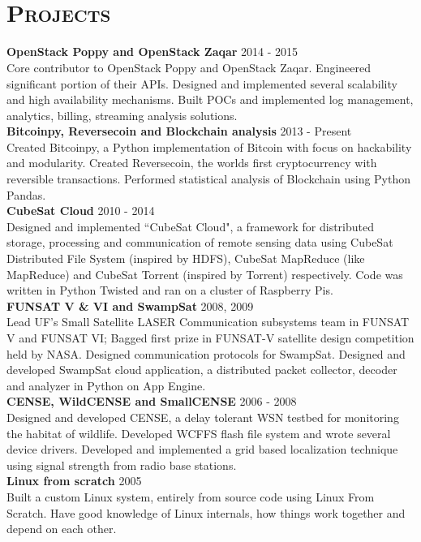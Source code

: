 \begin{resume}
\begin{formatb}
  \\
  \body\\
\end{formatb}

\section{\textsc{Projects}}
\textbf{OpenStack Poppy and OpenStack Zaqar} \hfill 2014 - 2015\\
Core contributor to OpenStack Poppy and OpenStack Zaqar. Engineered significant portion of their APIs. Designed and implemented several scalability and high availability mechanisms. Built POCs and implemented log management, analytics, billing, streaming analysis solutions.\\
\textbf{Bitcoinpy, Reversecoin and Blockchain analysis} \hfill 2013 - Present\\
Created Bitcoinpy, a Python implementation of Bitcoin with focus on hackability and modularity. Created Reversecoin, the worlds first cryptocurrency with reversible transactions. Performed statistical analysis of Blockchain using Python Pandas.\\
\textbf{CubeSat Cloud} \hfill 2010 - 2014 \\
Designed and implemented ``CubeSat Cloud", a framework for distributed storage, processing and communication of remote sensing data using CubeSat Distributed File System (inspired by HDFS), CubeSat MapReduce (like MapReduce) and CubeSat Torrent (inspired by Torrent) respectively. Code was written in Python Twisted and ran on a cluster of Raspberry Pis.\\
\textbf{FUNSAT V \& VI and SwampSat} \hfill 2008, 2009 \\
Lead UF's Small Satellite LASER Communication subsystems team in FUNSAT V and FUNSAT VI; Bagged first prize in FUNSAT-V satellite design competition held by NASA. Designed communication protocols for SwampSat. Designed and developed SwampSat cloud application, a distributed packet collector, decoder and analyzer in Python on App Engine.\\
\textbf{CENSE, WildCENSE and SmallCENSE} \hfill 2006 - 2008\\
Designed and developed CENSE, a delay tolerant WSN testbed for monitoring the habitat of wildlife. Developed WCFFS flash file system and wrote several device drivers. Developed and implemented a grid based localization technique using signal strength from radio base stations.\\
\textbf{Linux from scratch} \hfill 2005 \\
Built a custom Linux system, entirely from source code using Linux From Scratch. Have good knowledge of Linux internals, how things work together and depend on each other.


\end{resume}
